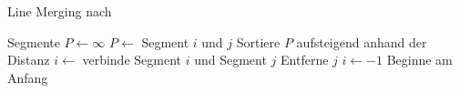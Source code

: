 \begin{algorithm}[!ht]\small
\caption{Line Merging nach \citeauthor{hirzer08}}
\label{alg:linemerging-hirzer}
\begin{algorithmic}[1]
	\Require Segmente
	\State $P \gets \infty$
						\State $P \gets$ Segment $i$ und $j$
					\EndIf
				\EndIf
			\EndIf
		\EndFor
		\State Sortiere $P$ aufsteigend anhand der Distanz
			\State $i \gets$ verbinde Segment $i$ und Segment $j$
			\State Entferne $j$
			\State $i \gets -1$
			\Comment Beginne am Anfang
		\EndFor
	\EndFor
\end{algorithmic}
\end{algorithm}
